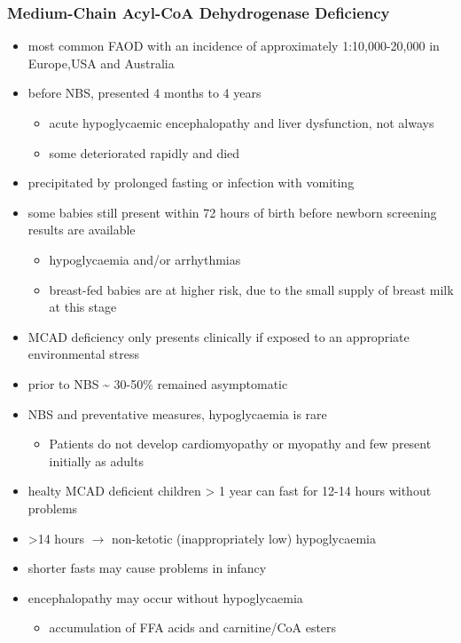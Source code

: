 \documentclass{scrartcl}
\begin{document}
\subsubsection{Medium-Chain Acyl-CoA Dehydrogenase Deficiency}
\label{sec:org262fe3e}
\begin{itemize}
\item most common FAOD with an incidence of approximately 1:10,000-20,000
in Europe,USA and Australia
\item before NBS, presented 4 months to 4 years
\begin{itemize}
\item acute hypoglycaemic encephalopathy and liver dysfunction, not always
\item some deteriorated rapidly and died
\end{itemize}
\item precipitated by prolonged fasting or infection with vomiting
\item some babies still present within 72 hours of birth before
newborn screening results are available
\begin{itemize}
\item hypoglycaemia and/or arrhythmias
\item breast-fed babies are at higher risk, due to the small supply of
breast milk at this stage
\end{itemize}
\item MCAD deficiency only presents clinically if exposed to an
appropriate environmental stress
\item prior to NBS \textasciitilde{} 30-50\% remained asymptomatic
\item NBS and preventative measures, hypoglycaemia is rare
\begin{itemize}
\item Patients do not develop cardiomyopathy or myopathy and few present
initially as adults
\end{itemize}
\item healty MCAD deficient children > 1 year can fast for 12-14 hours without problems
\item >14 hours \(\to\) non-ketotic (inappropriately low) hypoglycaemia
\item shorter fasts may cause problems in infancy
\item encephalopathy may occur without hypoglycaemia
\begin{itemize}
\item accumulation of FFA acids and carnitine/CoA esters
\end{itemize}
\end{itemize}
\end{document}
